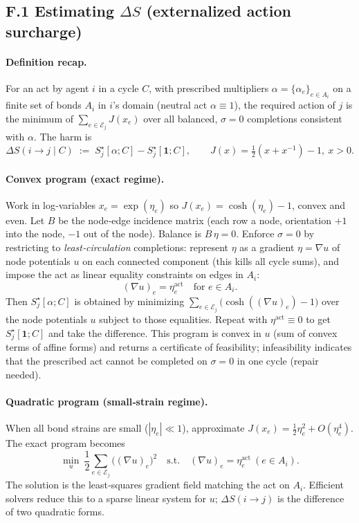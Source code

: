\documentclass[11pt]{article}
\begin{document}
\subsection*{F.1 Estimating $\Delta S$ (externalized action surcharge)}

\paragraph{Definition recap.}
For an act by agent $i$ in a cycle $C$, with prescribed multipliers $\alpha=\{\alpha_e\}_{e\in A_i}$ on a finite set of bonds $A_i$ in $i$'s domain (neutral act $\alpha\equiv 1$), the required action of $j$ is the minimum of $\sum_{e\in \mathcal{E}_j} J(x_e)$ over all balanced, $\sigma=0$ completions consistent with $\alpha$. The harm is
\[
\Delta S(i\!\to\! j\mid C)\;:=\;S_j^\star[\alpha;C]-S_j^\star[\mathbf{1};C],\qquad
J(x)=\tfrac12(x+x^{-1})-1,\ x>0.
\]

\paragraph{Convex program (exact regime).}
Work in log‑variables $x_e=\exp(\eta_e)$ so $J(x_e)=\cosh(\eta_e)-1$, convex and even. Let $B$ be the node‑edge incidence matrix (each row a node, orientation $+1$ into the node, $-1$ out of the node). Balance is $B\,\eta=0$. Enforce $\sigma=0$ by restricting to \emph{least‑circulation} completions: represent $\eta$ as a gradient $\eta=\nabla u$ of node potentials $u$ on each connected component (this kills all cycle sums), and impose the act as linear equality constraints on edges in $A_i$:
\[
(\nabla u)_e = \eta^{\text{act}}_e\quad \text{for }e\in A_i.
\]
Then $S_j^\star[\alpha;C]$ is obtained by minimizing $\sum_{e\in \mathcal{E}_j} \big(\cosh((\nabla u)_e)-1\big)$ over the node potentials $u$ subject to those equalities. Repeat with $\eta^{\text{act}}\equiv 0$ to get $S_j^\star[\mathbf{1};C]$ and take the difference. This program is convex in $u$ (sum of convex terms of affine forms) and returns a certificate of feasibility; infeasibility indicates that the prescribed act cannot be completed on $\sigma=0$ in one cycle (repair needed).

\paragraph{Quadratic program (small‑strain regime).}
When all bond strains are small ($|\eta_e|\ll 1$), approximate $J(x_e)=\tfrac12\eta_e^2+O(\eta_e^4)$. The exact program becomes
\[
\min_{u}\ \frac12\sum_{e\in \mathcal{E}_j}\big((\nabla u)_e\big)^2
\quad\text{s.t.}\quad
(\nabla u)_e=\eta^{\text{act}}_e\ (e\in A_i).
\]
The solution is the least‑squares gradient field matching the act on $A_i$. Efficient solvers reduce this to a sparse linear system for $u$; $\Delta S(i\!\to\! j)$ is the difference of two quadratic forms.
\end{document}
